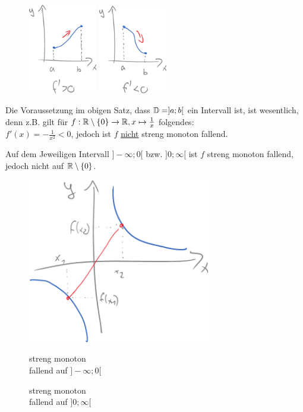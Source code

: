 \begin{figure}[h!]
	\centering
	\begin{minipage}{0.4\linewidth}
		\centering
		\includegraphics[width=3cm]{Bilder/142}
	\end{minipage}
	\qquad
	\begin{minipage}{0.4\linewidth}
		\centering
		\includegraphics[width=3cm]{Bilder/143}
	\end{minipage}
	\caption{}
\end{figure}

\Beachte Die Voraussetzung im obigen Satz, dass $\mathbb{D}=]a;b[$ ein Intervall ist, ist wesentlich, denn z.B. gilt für $f:\mathbb{R}\setminus\{0\}\to\mathbb{R},x\mapsto\frac{1}{x}$ folgendes:\\
$f'(x)=-\frac{1}{x^2}<0$, jedoch ist $f$ \ul{nicht} streng monoton fallend.

Auf dem Jeweiligen Intervall $]-\infty;0[$ bzw. $]0;\infty[$ ist $f$ streng monoton fallend, jedoch nicht auf $\mathbb{R}\setminus\{0\}$.

\begin{figure}[h!]
	\centering
	\includegraphics[width=8cm]{Bilder/144}\\
	\begin{minipage}{4cm}
		\centering
		streng monoton\\
		fallend auf $]-\infty;0[$
	\end{minipage}
	\qquad
	\begin{minipage}{4cm}
		\centering
		streng monoton\\
		fallend auf $]0;\infty[$
	\end{minipage}
	\caption{}
\end{figure}

